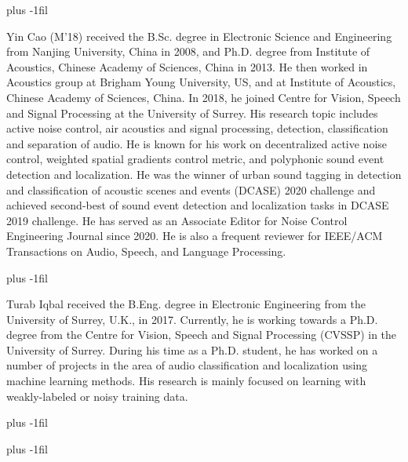 \documentclass[journal]{IEEEtran}
\begin{document}
\vskip 0pt plus -1fil

\begin{IEEEbiography}{Yin Cao} (M'18) received the B.Sc. degree in Electronic Science and Engineering from Nanjing University, China in 2008, and Ph.D. degree from Institute of Acoustics, Chinese Academy of Sciences, China in 2013. He then worked in Acoustics group at Brigham Young University, US, and at Institute of Acoustics, Chinese Academy of Sciences, China. In 2018, he joined Centre for Vision, Speech and Signal Processing at the University of Surrey. His research topic includes active noise control, air acoustics and signal processing, detection, classification and separation of audio. He is known for his work on decentralized active noise control, weighted spatial gradients control metric, and polyphonic sound event detection and localization. He was the winner of urban sound tagging in detection and classification of acoustic scenes and events (DCASE) 2020 challenge and achieved second-best of sound event detection and localization tasks in DCASE 2019 challenge. He has served as an Associate Editor for Noise Control Engineering Journal since 2020. He is also a frequent reviewer for IEEE/ACM Transactions on Audio, Speech, and Language Processing.
\end{IEEEbiography}

\vskip 0pt plus -1fil

\begin{IEEEbiography}{Turab Iqbal} received the B.Eng. degree in Electronic Engineering from the University of Surrey, U.K., in 2017. Currently, he is working towards a Ph.D. degree from the Centre for Vision, Speech and Signal Processing (CVSSP) in the University of Surrey. During his time as a Ph.D. student, he has worked on a number of projects in the area of audio classification and localization using machine learning methods. His research is mainly focused on learning with weakly-labeled or noisy training data.
\end{IEEEbiography}

\vskip 0pt plus -1fil

\vskip 0pt plus -1fil
\end{document}
